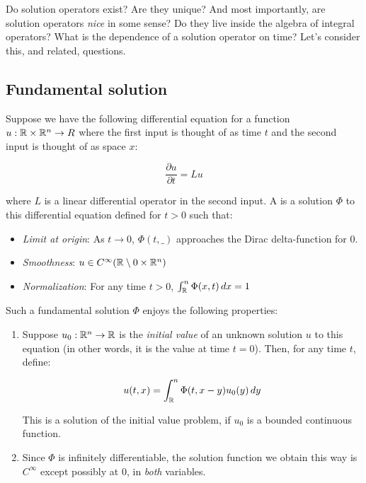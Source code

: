 \documentclass[a4paper]{amsart}
\begin{document}
Do solution operators exist? Are they unique? And most importantly,
are solution operators {\em nice} in some sense? Do they live inside
the algebra of integral operators? What is the dependence of a
solution operator on time? Let's consider this, and related,
questions.

\subsection{Fundamental solution}

Suppose we have the following differential equation for a function $u:
\mathbb{R} \times \mathbb{R}^n \to R$ where the first input is thought of as time $t$
and the second input is thought of as space $x$:

$$\frac{\partial u}{\partial t} = Lu$$

where $L$ is a linear differential operator in the second input. A
 is a solution $\Phi$ to this
differential equation defined for $t > 0$ such that:

\begin{itemize}

\item {\em Limit at origin}: As $t \to 0$, $\Phi(t, \_)$ approaches the Dirac delta-function for
  $0$.

\item {\em Smoothness}: $u \in C^\infty(\mathbb{R} \setminus 0 \times \mathbb{R}^n)$

\item {\em Normalization}: For any time $t > 0$, $\int_{\mathbb{R}}^n \Phi(x,t) \, dx = 1$

\end{itemize}

Such a fundamental solution $\Phi$ enjoys the following properties:

\begin{enumerate}

\item Suppose $u_0:\mathbb{R}^n \to \mathbb{R}$ is the {\em initial value} of an
  unknown solution $u$ to this equation (in other words, it is the
  value at time $t = 0$). Then, for any time $t$, define:

  $$u(t,x) = \int_{\mathbb{R}}^n \Phi(t,x-y)u_0(y) \, dy$$

  This is a solution of the initial value problem, if $u_0$ is a
  bounded continuous function.

\item Since $\Phi$ is infinitely differentiable, the solution function
  we obtain this way is $C^\infty$ except possibly at $0$, in {\em
    both} variables.

\end{enumerate}
\end{document}
